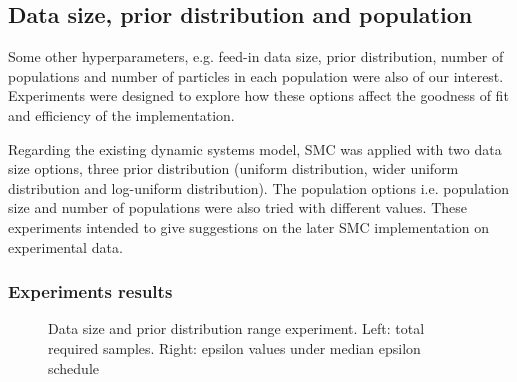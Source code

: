 \subsection{Data size, prior distribution and population}


Some other hyperparameters, e.g. feed-in data size, prior distribution, number of populations and number of particles in each population were also of our interest. Experiments were designed to explore how these options affect the goodness of fit and efficiency of the implementation.

Regarding the existing dynamic systems model, SMC was applied with two data size options, three prior distribution (uniform distribution, wider uniform distribution and log-uniform distribution). The population options i.e. population size and number of populations were also tried with different values. These experiments intended to give suggestions on the later SMC implementation on experimental data.

\subsubsection{Experiments results}

\begin{figure}[H]
    \begin{center}
    \end{center}

    \caption[Data size and prior distribution range experiment]%
    {Data size and prior distribution range experiment. Left: total required samples. Right: epsilon values under median epsilon schedule}
    \label{fig:size}

\end{figure}

